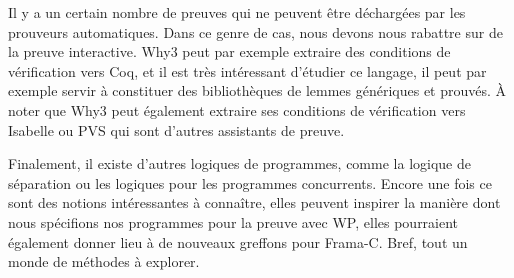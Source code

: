 Il y a un certain nombre de preuves qui ne peuvent être déchargées par les
prouveurs automatiques. Dans ce genre de cas, nous devons nous rabattre sur de
la preuve interactive. Why3 peut par exemple extraire des conditions de
vérification vers Coq, et il est très intéressant d'étudier ce langage, il peut
par exemple servir à constituer des bibliothèques de lemmes génériques et
prouvés. À noter que Why3 peut également extraire ses conditions de vérification
vers Isabelle ou PVS qui sont d'autres assistants de preuve.



Finalement, il existe d'autres logiques de programmes, comme la logique de
séparation ou les logiques pour les programmes concurrents. Encore une fois ce
sont des notions intéressantes à connaître, elles peuvent inspirer la manière dont
nous spécifions nos programmes pour la preuve avec WP, elles pourraient également
donner lieu à de nouveaux greffons pour Frama-C. Bref, tout un monde de méthodes à
explorer.
